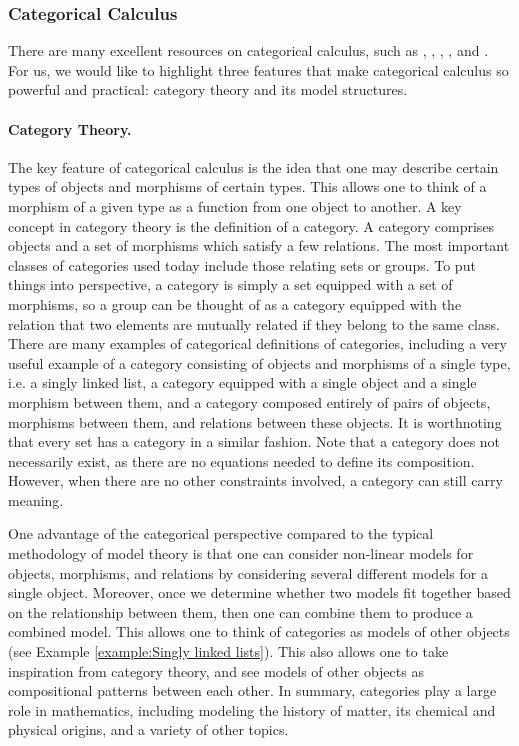 \documentclass[a4paper,reqno,oneside]{article}
\begin{document}
\subsubsection{Categorical Calculus}
There are many excellent resources on categorical calculus, such as \cite{Johnson:1976,McDermott:1983}, \cite{Bennett:1993}, \cite{Lambert:1993}, \cite{Mills:1996}, and \cite{Witten:2004}. For us, we would like to highlight three features that make categorical calculus so powerful and practical: category theory and its model structures.

\paragraph{Category Theory.} The key feature of categorical calculus is the idea that one may describe certain types of objects and morphisms of certain types. This allows one to think of a morphism of a given type as a function from one object to another. A key concept in category theory is the definition of a category. A category comprises objects and a set of morphisms which satisfy a few relations. The most important classes of categories used today include those relating sets or groups. To put things into perspective, a category is simply a set equipped with a set of morphisms, so a group can be thought of as a category equipped with the relation that two elements are mutually related if they belong to the same class. There are many examples of categorical definitions of categories, including a very useful example of a category consisting of objects and morphisms of a single type, i.e. a singly linked list, a category equipped with a single object and a single morphism between them, and a category composed entirely of pairs of objects, morphisms between them, and relations between these objects. It is worthnoting that every set has a category in a similar fashion. Note that a category does not necessarily exist, as there are no equations needed to define its composition. However, when there are no other constraints involved, a category can still carry meaning.

One advantage of the categorical perspective compared to the typical methodology of model theory is that one can consider non-linear models for objects, morphisms, and relations by considering several different models for a single object. Moreover, once we determine whether two models fit together based on the relationship between them, then one can combine them to produce a combined model. This allows one to think of categories as models of other objects (see Example \ref{example:Singly linked lists}). This also allows one to take inspiration from category theory, and see models of other objects as compositional patterns between each other. In summary, categories play a large role in mathematics, including modeling the history of matter, its chemical and physical origins, and a variety of other topics. 
\end{document}
